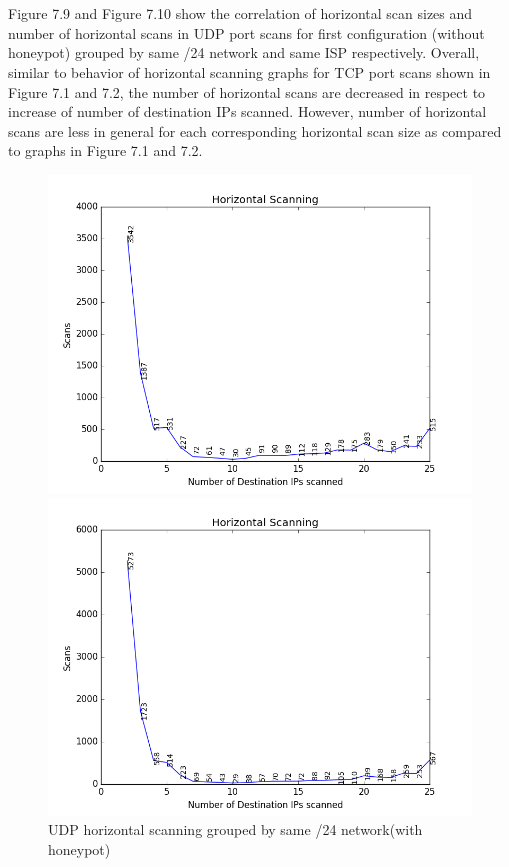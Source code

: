 \\\\
Figure 7.9 and Figure 7.10 show the correlation of horizontal scan sizes and number of horizontal scans in UDP port scans for first configuration (without honeypot) grouped by same /24 network and same ISP respectively.
Overall, similar to behavior of  horizontal scanning graphs for TCP port scans shown in Figure 7.1 and 7.2, the number of horizontal scans are decreased in respect to increase of number of destination IPs scanned.
However, number of horizontal scans are less in general for each corresponding horizontal scan size as compared to graphs in Figure 7.1 and 7.2.
\begin{figure}[h!]
\captionsetup{justification   = raggedright,
              singlelinecheck = false}
\centering
\begin{minipage}{.535\textwidth}
  \centering
  \includegraphics[width=1\linewidth]{images/horizontalscan_udp_classc_honeypot}
  \caption{UDP horizontal scanning grouped by same /24 network(with honeypot)}
  \label{fig:horizontalscanningudpsameclasscwithhoneypot}
\end{minipage}%
\begin{minipage}{.535\textwidth}
  \centering
  \includegraphics[width=1\linewidth]{images/horizontalscan_udp_isp_honeypot}

\end{minipage}
\end{figure}
